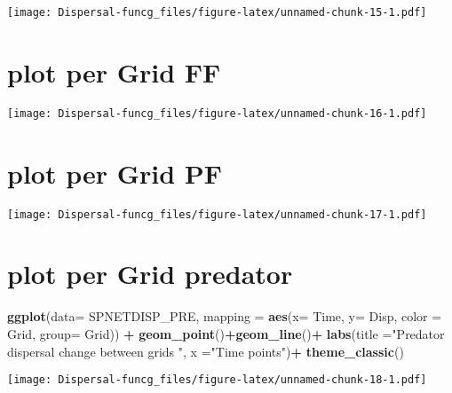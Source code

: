 \documentclass[]{article}
\newenvironment{Shaded}{\begin{snugshade}}{\end{snugshade}}
\newcommand{\KeywordTok}[1]{\textcolor[rgb]{0.13,0.29,0.53}{\textbf{#1}}}
\newcommand{\DataTypeTok}[1]{\textcolor[rgb]{0.13,0.29,0.53}{#1}}
\newcommand{\StringTok}[1]{\textcolor[rgb]{0.31,0.60,0.02}{#1}}
\newcommand{\OperatorTok}[1]{\textcolor[rgb]{0.81,0.36,0.00}{\textbf{#1}}}
\newcommand{\NormalTok}[1]{#1}
\begin{document}
\texttt{[image: Dispersal-funcg\_files/figure-latex/unnamed-chunk-15-1.pdf]}

\section{plot per Grid FF}\label{plot-per-grid-ff}

\texttt{[image: Dispersal-funcg\_files/figure-latex/unnamed-chunk-16-1.pdf]}

\section{plot per Grid PF}\label{plot-per-grid-pf}

\texttt{[image: Dispersal-funcg\_files/figure-latex/unnamed-chunk-17-1.pdf]}

\section{plot per Grid predator}\label{plot-per-grid-predator}

\begin{Shaded}
\begin{Highlighting}[]
  \KeywordTok{ggplot}\NormalTok{(}\DataTypeTok{data=}\NormalTok{ SPNETDISP_PRE, }\DataTypeTok{mapping =} \KeywordTok{aes}\NormalTok{(}\DataTypeTok{x=}\NormalTok{ Time, }\DataTypeTok{y=}\NormalTok{ Disp, }\DataTypeTok{color =}\NormalTok{ Grid, }\DataTypeTok{group=}\NormalTok{ Grid)) }\OperatorTok{+}
\StringTok{ }\KeywordTok{geom_point}\NormalTok{()}\OperatorTok{+}\KeywordTok{geom_line}\NormalTok{()}\OperatorTok{+}
\StringTok{   }\KeywordTok{labs}\NormalTok{(}\DataTypeTok{title =}\StringTok{"Predator dispersal change between grids "}\NormalTok{, }\DataTypeTok{x =}\StringTok{"Time points"}\NormalTok{)}\OperatorTok{+}
\KeywordTok{theme_classic}\NormalTok{()}
\end{Highlighting}
\end{Shaded}

\texttt{[image: Dispersal-funcg\_files/figure-latex/unnamed-chunk-18-1.pdf]}
\end{document}
